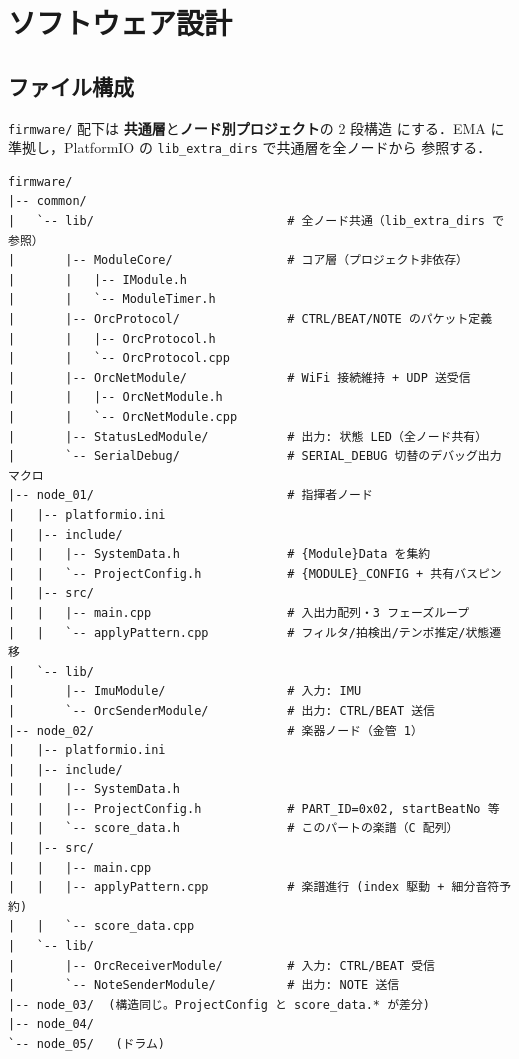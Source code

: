 \documentclass[lualatex,book,paper=a4paper,jafontsize=11.5pt,jafontscale=1.05]{jlreq}
\begin{document}
\section{ソフトウェア設計}\label{sec:sw-design}

\subsection{ファイル構成}\label{subsec:file-tree}

\texttt{firmware/} 配下は \textbf{共通層}と\textbf{ノード別プロジェクト}の 2 段構造
にする．EMA に準拠し，PlatformIO の \texttt{lib\_extra\_dirs} で共通層を全ノードから
参照する．

\begin{tcolorbox}[colback=codebg,colframe=black,boxrule=0.5pt,arc=2pt,breakable,
  left=4pt,right=4pt,top=8pt,bottom=4pt,
  title={firmware/ ディレクトリ構成（抜粋）},
  fonttitle=\bfseries\small,coltitle=black,
  attach boxed title to top left={xshift=4mm,yshift*=-2mm},
  boxed title style={colback=white,colframe=black,sharp corners=northwest}]
\begin{Verbatim}[fontsize=\footnotesize,xleftmargin=2pt]
firmware/
|-- common/
|   `-- lib/                           # 全ノード共通（lib_extra_dirs で参照）
|       |-- ModuleCore/                # コア層（プロジェクト非依存）
|       |   |-- IModule.h
|       |   `-- ModuleTimer.h
|       |-- OrcProtocol/               # CTRL/BEAT/NOTE のパケット定義
|       |   |-- OrcProtocol.h
|       |   `-- OrcProtocol.cpp
|       |-- OrcNetModule/              # WiFi 接続維持 + UDP 送受信
|       |   |-- OrcNetModule.h
|       |   `-- OrcNetModule.cpp
|       |-- StatusLedModule/           # 出力: 状態 LED（全ノード共有）
|       `-- SerialDebug/               # SERIAL_DEBUG 切替のデバッグ出力マクロ
|-- node_01/                           # 指揮者ノード
|   |-- platformio.ini
|   |-- include/
|   |   |-- SystemData.h               # {Module}Data を集約
|   |   `-- ProjectConfig.h            # {MODULE}_CONFIG + 共有バスピン
|   |-- src/
|   |   |-- main.cpp                   # 入出力配列・3 フェーズループ
|   |   `-- applyPattern.cpp           # フィルタ/拍検出/テンポ推定/状態遷移
|   `-- lib/
|       |-- ImuModule/                 # 入力: IMU
|       `-- OrcSenderModule/           # 出力: CTRL/BEAT 送信
|-- node_02/                           # 楽器ノード（金管 1）
|   |-- platformio.ini
|   |-- include/
|   |   |-- SystemData.h
|   |   |-- ProjectConfig.h            # PART_ID=0x02, startBeatNo 等
|   |   `-- score_data.h               # このパートの楽譜（C 配列）
|   |-- src/
|   |   |-- main.cpp
|   |   |-- applyPattern.cpp           # 楽譜進行 (index 駆動 + 細分音符予約)
|   |   `-- score_data.cpp
|   `-- lib/
|       |-- OrcReceiverModule/         # 入力: CTRL/BEAT 受信
|       `-- NoteSenderModule/          # 出力: NOTE 送信
|-- node_03/  (構造同じ。ProjectConfig と score_data.* が差分)
|-- node_04/
`-- node_05/   (ドラム)
\end{Verbatim}
\end{tcolorbox}
\end{document}
